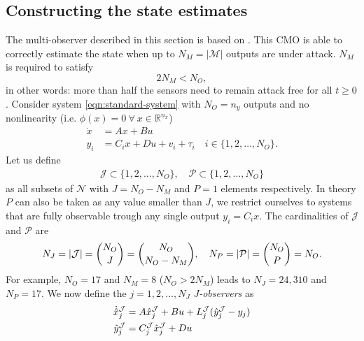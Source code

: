 \subsection{Constructing the state estimates}
\label{subsec:state-estimates}
The multi-observer described in this section is based on \cite[Section 3B]{Chong2015ObservabilityAttacks}. This CMO is able to correctly estimate the state when up to $N_M = |\mathcal{M}|$ outputs are under attack. $N_M$ is required to satisfy 
\begin{equation}\label{eqn:MO-size-requirement}
    2N_M<N_O,
\end{equation}
in other words: more than half the sensors need to remain attack free for all $t \geq 0$. Consider system \eqref{eqn:standard-system} with $N_O=n_y$ outputs and no nonlinearity (i.e. $\phi(x)=0 \ \forall \ x \in \mathbb{R}^{n_x}$)
\begin{equation*}
    \begin{split}
    \dot{x} &= Ax + Bu \\
        y_i &= C_ix + Du + v_i + \tau_i \quad i  \in \{1,2,\dots,N_O\}.
    \end{split}
\end{equation*}
Let us define 
\begin{equation}\label{eqn:observer-sets}
    \begin{split}
        \mathcal{J} \subset \{1,2,\dots,N_O\}, \quad \mathcal{P} \subset \{1,2,\dots,N_O\}
    \end{split}
\end{equation}
 as all subsets of $\mathcal{N}$ with $J=N_O-N_M$ and  $P=1$ elements respectively. In theory $P$ can also be taken as any value smaller than $J$, we restrict ourselves to systems that are fully observable trough any single output $y_i = C_ix$. The cardinalities of $\mathcal{J}$ and $\mathcal{P}$ are 
\begin{equation}\label{eqn:multi-observer-sizes}
    N_J = |\mathcal{J}|=\binom{N_O}{J}=\binom{N_O}{N_O-N_M}, \quad N_P = |\mathcal{P}| = \binom{N_O}{P} = N_O.
\end{equation}
For example, $N_O=17$ and $N_M=8$ ($N_O>2N_M$) leads to $N_J=24,310$ and $N_P=17$.
We now define the $j=1,2,\dots,N_J$ $J$\textit{-observers} as
\begin{equation*}
    \begin{split}
        \dot{\hat{x}}_j^{\mathcal{J}} &= A\hat{x}_j^{\mathcal{J}} + Bu + L^{\mathcal{J}}_j(\hat{y}_j^{\mathcal{J}} - y_j) \\
        \hat{y}_j^{\mathcal{J}} &= C^{\mathcal{J}}_j\hat{x}_j^{\mathcal{J}} + Du
    \end{split}
\end{equation*}
